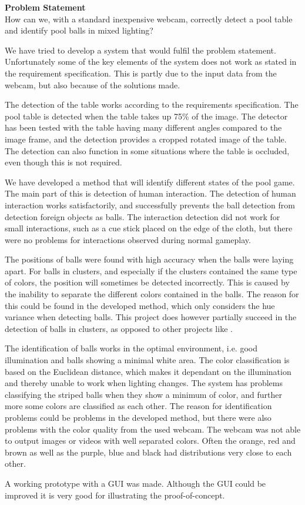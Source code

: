 \textbf{Problem Statement}\\
How can we, with a standard inexpensive webcam, correctly detect a pool table and identify pool balls in mixed lighting?

We have tried to develop a system that would fulfil the problem statement. Unfortunately some of the key elements of the system does not work as stated in the requirement specification. This is partly due to the input data from the webcam, but also because of the solutions made.

The detection of the table works according to the requirements specification. The pool table is detected when the table takes up 75\% of the image. The detector has been tested with the table having many different angles compared to the image frame, and the detection provides a cropped rotated image of the table. The detection can also function in some situations where the table is occluded, even though this is not required.

We have developed a method that will identify different states of the pool game. The main part of this is detection of human interaction. The detection of human interaction works satisfactorily, and successfully prevents the ball detection from detection foreign objects as balls. The interaction detection did not work for small interactions, such as a cue stick placed on the edge of the cloth, but there were no problems for interactions observed during normal gameplay.

The positions of balls were found with high accuracy when the balls were laying apart. For balls in clusters, and especially if the clusters contained the same type of colors, the position will sometimes be detected incorrectly. This is caused by the inability to separate the different colors contained in the balls. The reason for this could be found in the developed method, which only considers the hue variance when detecting balls. This project does however partially succeed in the detection of balls in clusters, as opposed to other projects like \cite{supportBilliard}.

The identification of balls works in the optimal environment, i.e. good illumination and balls showing a minimal white area. The color classification is based on the Euclidean distance, which makes it dependant on the illumination and thereby unable to work when lighting changes.
The system has problems classifying the striped balls when they show a minimum of color, and further more some colors are classified as each other. The reason for identification problems could be problems in the developed method, but there were also problems with the color quality from the used webcam. The webcam was not able to output images or videos with well separated colors. Often the orange, red and brown as well as the purple, blue and black had distributions very close to each other.

A working prototype with a GUI was made. Although the GUI could be improved it is very good for illustrating the proof-of-concept.